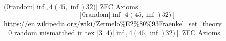 ${( 0 \text{random} {[\inf, 4 ( 45, \inf) 32)}]}$
\href{https://en.wikipedia.org/wiki/Zermelo\%E2\%80\%93Fraenkel_set_theory}{ZFC Axioms}
$$
[ 0 \text{random} {[\inf, 4 
( 45, \inf) 32
)}
]
$$
\url{https://en.wikipedia.org/wiki/Zermelo\%E2\%80\%93Fraenkel_set_theory}
$[ 0 \text{ random mismatched in tex {[3, 4)}} {[\inf, 4 ( 45, \inf) 32)}]$
\href{https://en.wikipedia.org/wiki/Construction_of_the_real_numbers}{ZFC Axioms}
